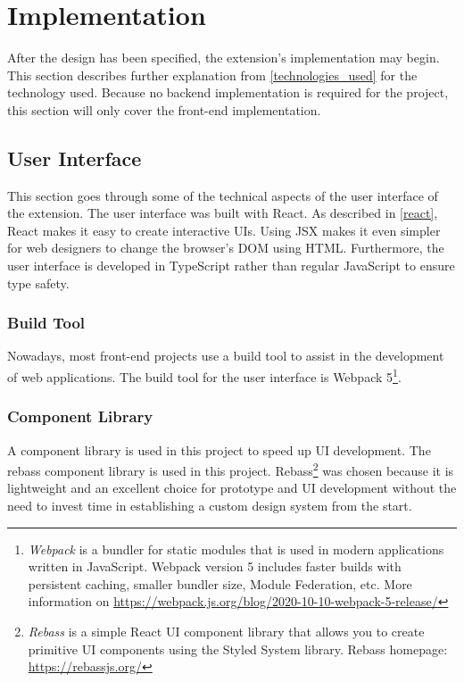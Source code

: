 \newpage
\chapter{Implementation}
After the design has been specified, the extension's implementation may begin. This section describes further explanation from \autoref{technologies_used} for the technology used. Because no backend implementation is required for the project, this section will only cover the front-end implementation.

\section{User Interface}
This section goes through some of the technical aspects of the user interface of the extension. The user interface was built with React. As described in \autoref{react}, React makes it easy to create interactive UIs. Using JSX makes it even simpler for web designers to change the browser's DOM using HTML. Furthermore, the user interface is developed in TypeScript rather than regular JavaScript to ensure type safety.

\subsection{Build Tool}
Nowadays, most front-end projects use a build tool to assist in the development of web applications. The build tool for the user interface is Webpack 5\footnote{\emph{Webpack} is a bundler for static modules that is used in modern applications written in JavaScript. Webpack version 5 includes faster builds with persistent caching, smaller bundler size, Module Federation, etc. More information on \url{https://webpack.js.org/blog/2020-10-10-webpack-5-release/}}.

\subsection{Component Library}
A component library is used in this project to speed up UI development. The rebass component library is used in this project. Rebass\footnote{\emph{Rebass} is a simple React UI component library that allows you to create primitive UI components using the Styled System library. Rebass homepage: \url{https://rebassjs.org/}} was chosen because it is lightweight and an excellent choice for prototype and UI development without the need to invest time in establishing a custom design system from the start.

